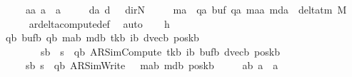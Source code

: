 \begin{isabellebody}
\ \ \ \ \ a{}a{\isacharcolon}{\kern0pt}\ {\isachardoublequoteopen}a{}\ {\isacharequal}{\kern0pt}\ a{\isachardoublequoteclose}\isanewline
\ \ \ \ \ d{}a{\isacharcolon}{\kern0pt}\ {\isachardoublequoteopen}d{}\ {\isacharequal}{\kern0pt}\ {\isacharparenleft}{\kern0pt}{\isasymlambda}{\isacharunderscore}{\kern0pt}{\isachardot}{\kern0pt}\ dir{\isachardot}{\kern0pt}N{\isacharparenright}{\kern0pt}{\isachardoublequoteclose}\isanewline
\ \ \ \ \ ma{\isacharcolon}{\kern0pt}\ \ {\isachardoublequoteopen}{\isacharparenleft}{\kern0pt}qa{\isacharcomma}{\kern0pt}\ buf{\isacharcomma}{\kern0pt}\ qa{\isacharprime}{\kern0pt}{\isacharcomma}{\kern0pt}\ m{\isacharunderscore}{\kern0pt}aa{\isacharprime}{\kern0pt}{\isacharcomma}{\kern0pt}\ m{\isacharunderscore}{\kern0pt}da{\isacharparenright}{\kern0pt}\ {\isasymin}\ delta{\isacharunderscore}{\kern0pt}tm\ M{\isachardoublequoteclose}\isanewline
\ \ \ \ \isamarkupfalse%
\ ar{\isacharunderscore}{\kern0pt}delta{\isacharunderscore}{\kern0pt}compute{\isacharunderscore}{\kern0pt}def\ \isamarkupfalse%
\ auto\isanewline
\ \ \isamarkupfalse%
\ h{}\ \isamarkupfalse%
\ qb\ bufb\ qb{\isacharprime}{\kern0pt}\ m{\isacharunderscore}{\kern0pt}ab{\isacharprime}{\kern0pt}\ m{\isacharunderscore}{\kern0pt}db\ tkb\ ib\ dvecb\ poskb\ \isanewline
\ \ \ \ \ \ \ \ sb{\isacharcolon}{\kern0pt}\ \ {\isachardoublequoteopen}s\ {\isacharequal}{\kern0pt}\ {\isacharparenleft}{\kern0pt}qb{\isacharcomma}{\kern0pt}\ AR{\isacharunderscore}{\kern0pt}SimCompute{\isacharcomma}{\kern0pt}\ tkb{\isacharcomma}{\kern0pt}\ ib{\isacharcomma}{\kern0pt}\ bufb{\isacharcomma}{\kern0pt}\ dvecb{\isacharcomma}{\kern0pt}\ poskb{\isacharparenright}{\kern0pt}{\isachardoublequoteclose}\isanewline
\ \ \ \ \ s{}b{\isacharcolon}{\kern0pt}\ {\isachardoublequoteopen}s{}\ {\isacharequal}{\kern0pt}\ {\isacharparenleft}{\kern0pt}qb{\isacharprime}{\kern0pt}{\isacharcomma}{\kern0pt}\ AR{\isacharunderscore}{\kern0pt}SimWrite{\isacharcomma}{\kern0pt}\ {}{\isacharcomma}{\kern0pt}\ {}{\isacharcomma}{\kern0pt}\ m{\isacharunderscore}{\kern0pt}ab{\isacharprime}{\kern0pt}{\isacharcomma}{\kern0pt}\ m{\isacharunderscore}{\kern0pt}db{\isacharcomma}{\kern0pt}\ poskb{\isacharparenright}{\kern0pt}{\isachardoublequoteclose}\isanewline
\ \ \ \ \ a{}b{\isacharcolon}{\kern0pt}\ {\isachardoublequoteopen}a{}\ {\isacharequal}{\kern0pt}\ a{\isachardoublequoteclose}\isanewline

\end{isabellebody}
